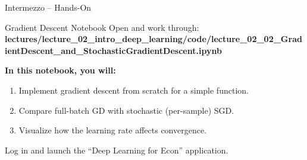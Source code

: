 \documentclass[aspectratio=169,11pt]{beamer}
\begin{document}
\begin{frame}{Intermezzo -- Hands-On}
\begin{block}{Gradient Descent Notebook}
Open and work through: \textbf{lectures/lecture\_02\_intro\_deep\_learning/code/lecture\_02\_02\_GradientDescent\_and\_StochasticGradientDescent.ipynb}
\end{block}

\vspace{0.5cm}
\textbf{In this notebook, you will:}
\begin{enumerate}
    \item Implement gradient descent from scratch for a simple function.
    \item Compare full-batch GD with stochastic (per-sample) SGD.
    \item Visualize how the learning rate affects convergence.
\end{enumerate}

\vspace{0.5cm}
\begin{center}
{\small Log in and launch the ``Deep Learning for Econ'' application.}
\end{center}
\end{frame}
\end{document}
